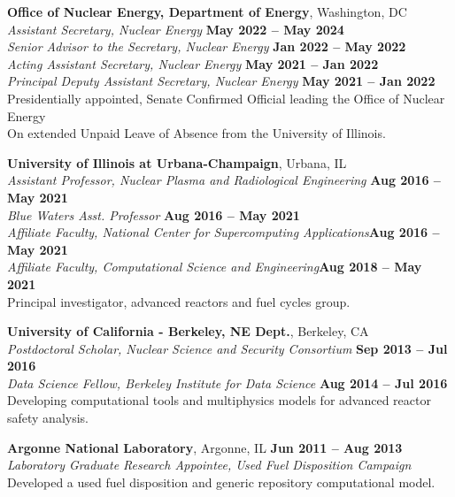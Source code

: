 \documentclass[margin,line]{resume}
\begin{document}
\begin{resume}
    \textbf{Office of Nuclear Energy, Department of Energy}, Washington, DC\\
                \textsl{Assistant Secretary, Nuclear Energy} \hfill \textbf{May 2022 -- May 2024}\\
                \textsl{Senior Advisor to the Secretary, Nuclear Energy} \hfill \textbf{Jan 2022 -- May 2022}\\
                \textsl{Acting Assistant Secretary, Nuclear Energy} \hfill \textbf{May 2021 -- Jan 2022}\\
                \textsl{Principal Deputy Assistant Secretary, Nuclear Energy} \hfill \textbf{May 2021 -- Jan 2022}\\
                Presidentially appointed, Senate Confirmed Official leading the Office of Nuclear Energy\\
                On extended Unpaid Leave of Absence from the University of Illinois.

    \textbf{University of Illinois at Urbana-Champaign}, Urbana, IL\\
                \textsl{Assistant Professor, Nuclear Plasma and Radiological Engineering} \hfill \textbf{Aug 2016 -- May 2021}\\
                \textsl{Blue Waters Asst. Professor} \hfill \textbf{Aug 2016 -- May 2021}\\
                \textsl{Affiliate Faculty, National Center for Supercomputing Applications}\hfill \textbf{Aug 2016 -- May 2021}\\
                \textsl{Affiliate Faculty, Computational Science and Engineering}\hfill \textbf{Aug 2018 -- May 2021}\\
                Principal investigator, advanced reactors and fuel cycles group.


    \textbf{University of California - Berkeley, NE Dept.}, Berkeley, CA \\
                \textsl{Postdoctoral Scholar, Nuclear Science and Security Consortium} \hfill \textbf{Sep 2013 -- Jul 2016}\\
                \textsl{Data Science Fellow, Berkeley Institute for Data Science} \hfill \textbf{Aug 2014 -- Jul 2016}\\
                Developing computational tools and multiphysics models for advanced reactor safety analysis.

    \textbf{Argonne National Laboratory}, Argonne, IL \hfill \textbf{Jun 2011 -- Aug 2013}\\
                \textsl{Laboratory Graduate Research Appointee, Used Fuel Disposition Campaign}\\
                Developed a used fuel disposition and generic repository computational model.


\end{resume}
\end{document}
